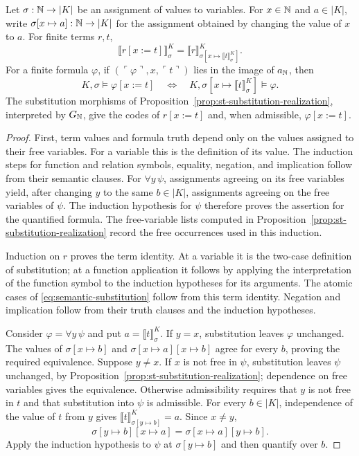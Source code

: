 \begin{lemma}\label{lem:semantic-substitution}
Let $\sigma:\mathbb N\to |K|$ be an assignment of values to variables.
For $x\in\mathbb N$ and $a\in|K|$, write
$\sigma[x\mapsto a]:\mathbb N\to|K|$ for the assignment obtained
by changing the value of $x$ to $a$. For finite terms $r,t$,
\[
 \llbracket r[x:=t]\rrbracket^K_\sigma
 =\llbracket r\rrbracket^K_{
          \sigma[x\mapsto\llbracket t\rrbracket^K_\sigma]}.
\]
For a finite formula $\varphi$, if
$(\ulcorner\varphi\urcorner,x,\ulcorner t\urcorner)$ lies in
the image of $a_{\mathbb N}$, then
\begin{equation}\label{eq:semantic-substitution}
 K,\sigma\models\varphi[x:=t]
 \quad\Longleftrightarrow\quad
 K,\sigma[x\mapsto\llbracket t\rrbracket^K_\sigma]
             \models\varphi.
\end{equation}
The substitution morphisms of
Proposition~\ref{prop:st-substitution-realization}, interpreted by
$G_{\mathbb N}$, give the codes of $r[x:=t]$ and, when admissible,
$\varphi[x:=t]$.
\end{lemma}
\begin{proof}
First, term values and formula truth depend only on the values
assigned to their free variables. For a variable this is the
definition of its value. The induction steps for function and
relation symbols, equality, negation, and implication follow from
their semantic clauses. For $\forall y\,\psi$, assignments agreeing
on its free variables yield, after changing $y$ to the same
$b\in|K|$, assignments agreeing on the free variables of $\psi$.
The induction hypothesis for $\psi$ therefore proves the assertion
for the quantified formula. The free-variable lists computed in
Proposition~\ref{prop:st-substitution-realization} record the free occurrences
used in this induction.

Induction on $r$ proves the term identity. At a variable it is the
two-case definition of substitution; at a function application it
follows by applying the interpretation of the function symbol to
the induction hypotheses for its arguments. The atomic cases of
\eqref{eq:semantic-substitution} follow from this term identity.
Negation and implication follow from their truth clauses and the
induction hypotheses.

Consider $\varphi=\forall y\,\psi$ and put
$a=\llbracket t\rrbracket^K_\sigma$. If $y=x$, substitution leaves
$\varphi$ unchanged. The values of
$\sigma[x\mapsto b]$ and
$\sigma[x\mapsto a][x\mapsto b]$ agree for every $b$, proving
the required equivalence. Suppose $y\ne x$. If $x$ is not free
in $\psi$, substitution leaves $\psi$ unchanged, by
Proposition~\ref{prop:st-substitution-realization}; dependence on free variables gives the equivalence. Otherwise admissibility
requires that $y$ is not free in $t$ and that substitution into
$\psi$ is admissible. For every $b\in|K|$, independence of the value of $t$ from $y$ gives
$\llbracket t\rrbracket^K_{\sigma[y\mapsto b]}=a$. Since $x\ne y$,
\[
 \sigma[y\mapsto b][x\mapsto a]
   =\sigma[x\mapsto a][y\mapsto b].
\]
Apply the induction hypothesis to $\psi$ at
$\sigma[y\mapsto b]$ and then quantify over $b$.
\end{proof}

